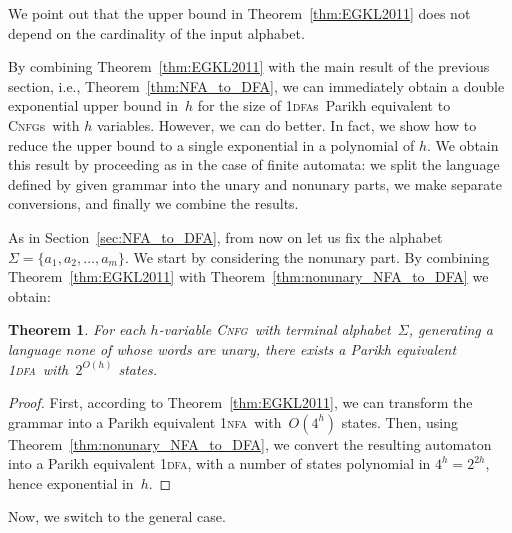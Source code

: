\documentclass[11pt]{article}
\newcommand*{\ow}{\textsc{1}}
\newcommand*{\owdfa}{\ow\textsc{dfa}}
\newcommand*{\owdfas}{\ow\textsc{dfa}s}
\newcommand*{\ownfa}{\ow\textsc{nfa}}
\newcommand*{\cnfg}{\textsc{Cnfg}}
\newcommand*{\cnfgs}{\textsc{Cnfg}s}
\newtheorem{theorem}{Theorem}[section]
\begin{document}
We point out that the upper bound in Theorem~\ref{thm:EGKL2011} does not depend on
the cardinality of the input alphabet.

By combining Theorem~\ref{thm:EGKL2011} with the main result of the previous section,
i.e., Theorem~\ref{thm:NFA_to_DFA}, we can immediately obtain a double exponential
upper bound in~$h$ for the size of \owdfas\ Parikh equivalent to \cnfgs\ with $h$ variables.
However, we can do better. In fact, we show how to reduce the upper bound to a single exponential 
in a polynomial of $h$. We obtain this result by proceeding as in the case of finite automata:
we split the language defined by given grammar into the unary and nonunary parts, we make separate conversions, 
and finally we combine the results.

\smallskip

As in Section~\ref{sec:NFA_to_DFA}, from now on let us fix the alphabet $\Sigma=\{a_1, a_2, \ldots, a_m\}$.
We start by considering the nonunary part.
By combining Theorem~\ref{thm:EGKL2011} with Theorem~\ref{thm:nonunary_NFA_to_DFA} we obtain:

\begin{theorem}\label{thm:nonunary_CFG_to_DFA}
	For each $h$-variable \cnfg\ with terminal alphabet~$\Sigma$, generating a language none of whose words are unary, 
	there exists a Parikh equivalent \owdfa\ with~$2^{O(h)}$ states. 
\end{theorem}
\begin{proof}
  First, according to Theorem~\ref{thm:EGKL2011}, we can transform the grammar into a Parikh equivalent
  \ownfa\ with~$O(4^h)$ states. Then, using Theorem~\ref{thm:nonunary_NFA_to_DFA}, we convert the resulting automaton
  into a Parikh equivalent \owdfa, with a number of states polynomial in $4^h=2^{2h}$, hence exponential
  in~$h$.
\end{proof}

Now, we switch to the general case.
\end{document}
